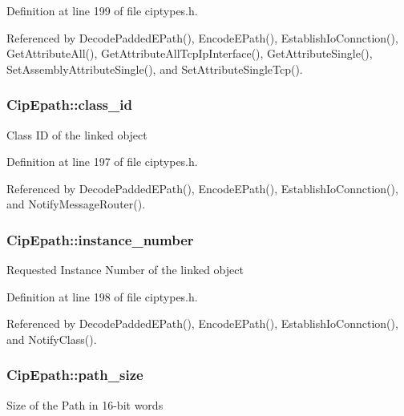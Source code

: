 \-Definition at line 199 of file ciptypes.\-h.



\-Referenced by \-Decode\-Padded\-E\-Path(), \-Encode\-E\-Path(), \-Establish\-Io\-Connction(), \-Get\-Attribute\-All(), \-Get\-Attribute\-All\-Tcp\-Ip\-Interface(), \-Get\-Attribute\-Single(), \-Set\-Assembly\-Attribute\-Single(), and \-Set\-Attribute\-Single\-Tcp().

\hypertarget{structCipEpath_afa1bed6dacf38bea9ec26342f33f4fc6}{
\subsubsection[{class\-\_\-id}]{ {\bf \-Cip\-Epath\-::class\-\_\-id}}}\label{d5/dd2/structCipEpath_afa1bed6dacf38bea9ec26342f33f4fc6}
\-Class \-I\-D of the linked object 

\-Definition at line 197 of file ciptypes.\-h.



\-Referenced by \-Decode\-Padded\-E\-Path(), \-Encode\-E\-Path(), \-Establish\-Io\-Connction(), and \-Notify\-Message\-Router().

\hypertarget{structCipEpath_a206c078bbda5b614b96cd61fd18d1cab}{
\subsubsection[{instance\-\_\-number}]{ {\bf \-Cip\-Epath\-::instance\-\_\-number}}}\label{d5/dd2/structCipEpath_a206c078bbda5b614b96cd61fd18d1cab}
\-Requested \-Instance \-Number of the linked object 

\-Definition at line 198 of file ciptypes.\-h.



\-Referenced by \-Decode\-Padded\-E\-Path(), \-Encode\-E\-Path(), \-Establish\-Io\-Connction(), and \-Notify\-Class().

\hypertarget{structCipEpath_af99160e384c9add3cd99fa48f1c83059}{
\subsubsection[{path\-\_\-size}]{ {\bf \-Cip\-Epath\-::path\-\_\-size}}}\label{d5/dd2/structCipEpath_af99160e384c9add3cd99fa48f1c83059}
\-Size of the \-Path in 16-\/bit words 

